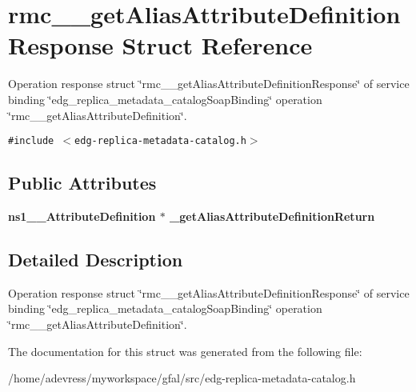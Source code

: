 \section{rmc\_\-\_\-get\-Alias\-Attribute\-Definition\-Response Struct Reference}
\label{structrmc____getAliasAttributeDefinitionResponse}
Operation response struct \char`\"{}rmc\_\-\_\-get\-Alias\-Attribute\-Definition\-Response\char`\"{} of service binding \char`\"{}edg\_\-replica\_\-metadata\_\-catalog\-Soap\-Binding\char`\"{} operation \char`\"{}rmc\_\-\_\-get\-Alias\-Attribute\-Definition\char`\"{}.  


{\tt \#include $<$edg-replica-metadata-catalog.h$>$}

\subsection*{Public Attributes}
\begin{CompactItemize}
\item 
\bf{ns1\_\-\_\-Attribute\-Definition} $\ast$ \textbf{\_\-get\-Alias\-Attribute\-Definition\-Return}\label{structrmc____getAliasAttributeDefinitionResponse_90e05efc2b5d6866a36ea28431d125d0}

\end{CompactItemize}


\subsection{Detailed Description}
Operation response struct \char`\"{}rmc\_\-\_\-get\-Alias\-Attribute\-Definition\-Response\char`\"{} of service binding \char`\"{}edg\_\-replica\_\-metadata\_\-catalog\-Soap\-Binding\char`\"{} operation \char`\"{}rmc\_\-\_\-get\-Alias\-Attribute\-Definition\char`\"{}. 



The documentation for this struct was generated from the following file:\begin{CompactItemize}
\item 
/home/adevress/myworkspace/gfal/src/edg-replica-metadata-catalog.h\end{CompactItemize}
